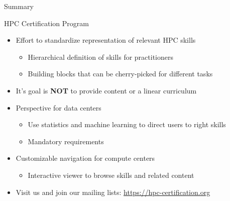 \documentclass[compress,aspectratio=169]{beamer}
\begin{document}
\begin{frame}{Summary}

	\begin{block}{HPC Certification Program}
		\begin{itemize}
			\item Effort to standardize representation of relevant HPC skills
      \begin{itemize}
        \item Hierarchical definition of skills for practitioners
        \item Building blocks that can be cherry-picked for different tasks
      \end{itemize}
      \item It's goal is \textbf{NOT} to provide content or a linear curriculum
			\item Perspective for data centers
				\begin{itemize}
					\item Use statistics and machine learning to direct users to right skills
					\item Mandatory requirements
				\end{itemize}
			\item Customizable navigation for compute centers
      \begin{itemize}
        \item Interactive viewer to browse skills and related content
      \end{itemize}
      \item Visit us and join our mailing lists: \url{https://hpc-certification.org}
		\end{itemize}
	\end{block}
\end{frame}
\end{document}
